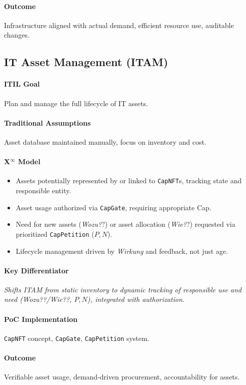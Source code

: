 \documentclass[12pt, a4paper]{scrartcl}
\newcommand{\Xinf}{X$^\infty$}                        %
\newcommand{\Wirkung}{\textit{Wirkung}}                 %
\newcommand{\CapNFT}{\texttt{CapNFT}}
\newcommand{\CapGate}{\texttt{CapGate}}
\newcommand{\CapPetition}{\texttt{CapPetition}}        %
\newcommand{\Wozu}{\textit{Wozu?}}                      %
\newcommand{\Wie}{\textit{Wie?}}                        %
\begin{document}
\paragraph{Outcome} Infrastructure aligned with actual demand, efficient resource use, auditable changes.

\subsection{IT Asset Management (ITAM)} %
\paragraph{ITIL Goal} Plan and manage the full lifecycle of IT assets.
\paragraph{Traditional Assumptions} Asset database maintained manually, focus on inventory and cost.
\paragraph*{\Xinf{} Model}
\begin{itemize}
    \item Assets potentially represented by or linked to \CapNFT{}s, tracking state and responsible entity.
    \item Asset usage authorized via \CapGate{}, requiring appropriate Cap.
    \item Need for new assets (\Wozu?) or asset allocation (\Wie?) requested via prioritized \CapPetition{} ($P,N$).
    \item Lifecycle management driven by \Wirkung{} and feedback, not just age.
\end{itemize}
\paragraph{Key Differentiator} \textit{Shifts ITAM from static inventory to dynamic tracking of responsible use and need (\Wozu?/\Wie?, $P,N$), integrated with authorization.}
\paragraph{PoC Implementation} \CapNFT{} concept, \CapGate{}, \CapPetition{} system.
\paragraph{Outcome} Verifiable asset usage, demand-driven procurement, accountability for assets.
\end{document}
